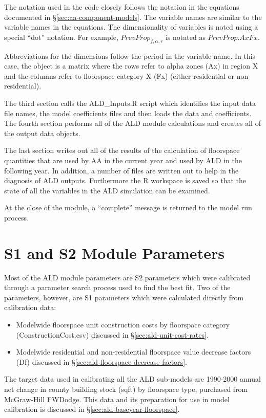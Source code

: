 \noindent The notation used in the code closely follows the notation in the equations documented in \S\ref{sec:aa-component-models}. The variable names are similar to the variable names in the equations. The dimensionality of variables is noted using a special ``dot'' notation. For example, $PrevProp_{f,\alpha,r}$ is notated as $PrevProp.AxFx$.

Abbreviations for the dimensions follow the period in the variable name. In this case, the object is a matrix where the rows refer to alpha zones (Ax) in region X and the columns refer to floorspace category X (Fx) (either residential or non-residential). 

The third section calls the ALD\_Inputs.R script which identifies the input data file names, the model coefficients files and then loads the data and coefficients. The fourth section performs all of the ALD module calculations and creates all of the output data objects.

The last section writes out all of the results of the calculation of floorspace quantities that are used by AA in the current year and used by ALD in the following year. In addition, a number of files are written out to help in the diagnosis of ALD outputs. Furthermore the R workspace is saved so that the state of all the variables in the ALD simulation can be examined.

At the close of the module, a ``complete'' message is returned to the model run process.

\section{S1 and S2 Module Parameters}
Most of the ALD module parameters are S2 parameters which were calibrated through a parameter search process used to find the best fit. Two of the parameters, however, are S1 parameters which were calculated directly from calibration data:
\begin{itemize}
\item Modelwide floorspace unit construction costs by floorspace category (ConstructionCost.csv) discussed in \S\ref{sec:ald-unit-cost-rates}.
\item Modelwide residential and non-residential floorspace value decrease factors (Df) discussed in \S\ref{sec:ald-floorspace-decrease-factors}.
\end{itemize}

The target data used in calibrating all the ALD sub-models are 1990-2000 annual net change in county building stock (sqft) by floorspace type, purchased from McGraw-Hill FWDodge. This data and its preparation for use in model calibration is discussed in \S\ref{sec:ald-baseyear-floorspace}.

